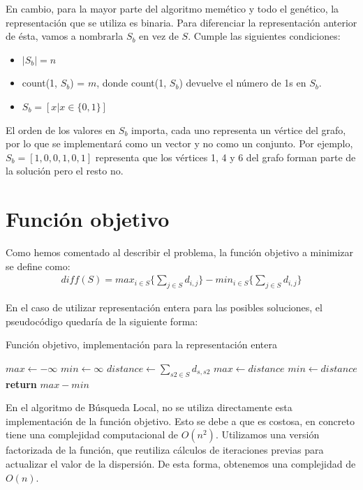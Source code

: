 En cambio, para la mayor parte del algoritmo memético y todo el genético, la representación que se utiliza es binaria. Para diferenciar la representación anterior de ésta, vamos a nombrarla $S_b$ en vez de $S$. Cumple las siguientes condiciones:
\begin{itemize}
    \item $|S_b| = n$
    \item count(1, $S_b$) = $m$, donde count(1, $S_b$) devuelve el número de 1s en $S_b$.
    \item $S_b = [x | x \in \{0,1\}]$
\end{itemize}
El orden de los valores en $S_b$ importa, cada uno representa un vértice del grafo, por lo que se implementará como un vector y no como un conjunto. Por ejemplo, $S_b = [1,0,0,1,0,1]$ representa que los vértices 1, 4 y 6 del grafo forman parte de la solución pero el resto no.




\section{Función objetivo}

Como hemos comentado al describir el problema, la función objetivo a minimizar se define como:
\begin{align*}
    diff(S) = max_{i \in S} \{ \sum_{j \in S} d_{i,j}\} - min_{i \in S} \{ \sum_{j \in S} d_{i,j}\}
\end{align*}

\noindent En el caso de utilizar representación entera para las posibles soluciones, el pseudocódigo quedaría de la siguiente forma:
\begin{algorithm}[H]
    \caption{Función objetivo, implementación para la representación entera}
\begin{algorithmic}
\State $max \gets -\infty$
\State $min \gets \infty$
    \State $distance \gets \sum_{s2 \in S} d_{s,s2}$
        \State $max \gets distance$
    \EndIf
        \State $min \gets distance$
    \EndIf
\EndFor
\State \textbf{return} $max - min$
\end{algorithmic}
\end{algorithm}

En el algoritmo de Búsqueda Local, no se utiliza directamente esta implementación de la función objetivo. Esto se debe a que es costosa, en concreto tiene una complejidad computacional de $O(n^2)$. Utilizamos una versión factorizada de la función, que reutiliza cálculos de iteraciones previas para actualizar el valor de la dispersión. De esta forma, obtenemos una complejidad de $O(n)$.

